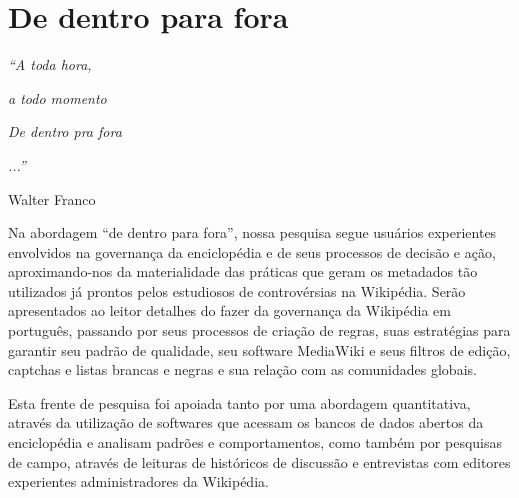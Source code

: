 \chapter{De dentro para fora}

\singlespacing
\begin{flushright}
\textit{``A toda hora,}

\textit{a todo momento}

\textit{De dentro pra fora}

\textit{...''}

Walter Franco
\end{flushright}
\doublespacing

Na abordagem ``de dentro para fora'', nossa pesquisa segue usuários experientes envolvidos na governança da enciclopédia e de seus processos de decisão e ação, aproximando-nos da materialidade das práticas que geram os metadados tão utilizados já prontos pelos estudiosos de controvérsias na Wikipédia. Serão apresentados ao leitor detalhes do fazer da governança da Wikipédia em português, passando por seus processos de criação de regras, suas estratégias para garantir seu padrão de qualidade, seu software MediaWiki e seus filtros de edição, captchas e listas brancas e negras e sua relação com as comunidades globais.

Esta frente de pesquisa foi apoiada tanto por uma abordagem quantitativa, através da utilização de softwares que acessam os bancos de dados abertos da enciclopédia e analisam padrões e comportamentos, como também por pesquisas de campo, através de leituras de históricos de discussão e entrevistas com editores experientes administradores da Wikipédia.

%
%



